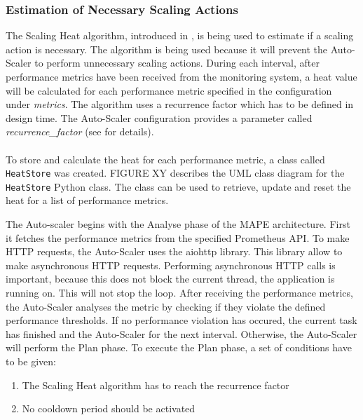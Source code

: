 \subsubsection{Estimation of Necessary Scaling Actions}

%
%

The Scaling Heat algorithm, introduced in , is being used to estimate if a scaling action is necessary.
The algorithm is being used because it will prevent the Auto-Scaler to perform unnecessary scaling actions.
During each interval, after performance metrics have been received from the monitoring system, a heat value will be calculated for each performance metric specified in the configuration under \textit{metrics}.
The algorithm uses a recurrence factor which has to be defined in design time. The Auto-Scaler configuration provides a parameter called \textit{recurrence\_factor} (see  for details). 

\paragraph{}To store and calculate the heat for each performance metric, a class called \texttt{HeatStore} was created.
FIGURE XY describes the UML class diagram for the \texttt{HeatStore} Python class.
The class can be used to retrieve, update and reset the heat for a list of performance metrics.


The Auto-scaler begins with the Analyse phase of the MAPE architecture.
First it fetches the performance metrics from the specified Prometheus API.
To make HTTP requests, the Auto-Scaler uses the aiohttp library. This library allow to make asynchronous HTTP requests.
Performing asynchronous HTTP calls is important, because this does not block the current thread, the application is running on. This will not stop the loop.
After receiving the performance metrics, the Auto-Scaler analyses the metric by checking if they violate the defined performance thresholds. If no performance violation has occured, the current task has finished and the Auto-Scaler for the next interval.
Otherwise, the Auto-Scaler will perform the Plan phase.
To execute the Plan phase, a set of conditions have to be given:
\begin{enumerate}
\item The Scaling Heat algorithm has to reach the recurrence factor
\item No cooldown period should be activated
\end{enumerate}

